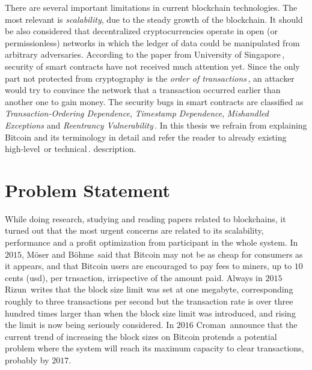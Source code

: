 \documentclass[USenglish]{uit-thesis}
\begin{document}
There are several important limitations in current blockchain technologies.
The most relevant is \emph{scalability}, due to the steady growth of the
blockchain. It should be also considered that
decentralized cryptocurrencies operate in open (or permissionless) networks
in which the ledger of data could be manipulated from arbitrary adversaries.
According to the paper from University of Singapore\,\cite{Luu:2016},
security of smart contracts have not received much attention yet.
Since the only part not protected from cryptography
is the \emph{order of transactions}\,\cite{ethereum_white_paper},
an attacker would try to convince the network that a transaction
occurred earlier than another one to gain money.
The security bugs in smart contracts are classified as
\emph{Transaction-Ordering Dependence},
\emph{Timestamp Dependence}, \emph{Mishandled Exceptions}
and \emph{Reentrancy Vulnerability}\,\cite{Luu:2016}.
In this thesis we refrain from explaining Bitcoin and its terminology in detail
and refer the reader to already existing high-level\,\cite{Underwood:2016:BBB,
Bohme2015BETG}
or technical\,\cite{Nakamoto_bitcoin, ethereum_white_paper}.
description.
\section{Problem Statement}
\label{sec:probdefinition}
While doing research, studying and reading papers related to blockchains,
it turned out that the most urgent concerns are related to
its scalability, performance and a profit optimization from participant
in the whole system.
In $2015$, Möser and Böhme\,\cite{Moser2015} said that
Bitcoin may not be as cheap for consumers as it appears, and
that Bitcoin users are encouraged to pay fees to miners, up
to $10$\,cents (\gls{usd}), per trnsaction, irrispective of the amount
paid.
Always in $2015$ Rizun\,\cite{Rizun:2015:blocksizelimit} writes that
the block size limit was set at one megabyte, corresponding
roughly to three transactions per second but
the transaction rate is over three hundred times larger
than when the block size limit was introduced, and rising the limit
is now being seriously considered.
In $2016$ Croman\,\cite{croman2016} announce that
the current trend of increasing the block sizes on Bitcoin protends
a potential problem where the system
will reach its maximum capacity to clear
transactions, probably by $2017$.
\end{document}
